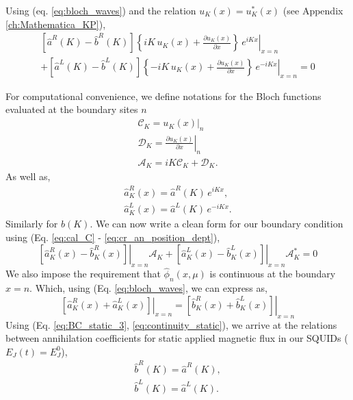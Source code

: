 %
Using (eq. \ref{eq:bloch_waves}) and the relation $u_K(x) = u^*_K(x)$ (see Appendix \ref{ch:Mathematica_KP}),
%
\begin{equation}\label{eq:BC_static_2}
\begin{split}
    \left[\hat{a}^R(K) - \hat{b}^R(K)\right]
    \left.
    \left\lbrace
    i K \, u_K(x) + \frac{\partial u_K(x)}{\partial x}
    \right\rbrace
    \,e^{i K x}
    \right|_{x=n}
    \\[2mm]
    +
    \left[\hat{a}^L(K) - \hat{b}^L(K)\right]
    \left.
    \left\lbrace
    -i K\, u_K(x) + \frac{\partial u_K(x)}{\partial x}
    \right\rbrace
    \,e^{-i K x} 
    \right|_{x=n}
    = 0 
\end{split}
\end{equation}
%




For computational convenience, we define notations for the Bloch functions evaluated at the boundary sites $n$
%
\begin{gather}
    \mathcal{C}_K = \left.u_K(x)\right|_{n}
    \label{eq:cal_C}\\
    \mathcal{D}_K = \left.\frac{\partial u_K(x)}{\partial x}\right|_{n}
    \label{eq:cal_D}\\
    \mathcal{A}_K = iK\mathcal{C}_K + \mathcal{D}_K.
    \label{eq:cal_A}
\end{gather}
%
As well as, 
\begin{subequations}\label{eq:cr_an_position_dept}
\begin{eqnarray}
    \hat{a}^R_K(x) = \hat{a}^R(K)\,e^{i K x},
    \\
    \hat{a}^L_K(x) = \hat{a}^L(K)\,e^{-i K x}. 
\end{eqnarray}
\end{subequations}
%
Similarly for $\hat{b}(K)$. We can now write a clean form for our boundary condition using (Eq. \ref{eq:cal_C} - \ref{eq:cr_an_position_dept}),
%
\begin{equation}\label{eq:BC_static_3}
    \left.\left[\hat{a}^R_K(x) - \hat{b}_K^R(x)\right]\right|_{x=n} \mathcal{A}_K
    +
    \left.\left[\hat{a}^L_K(x) - \hat{b}^L_K(x)\right]\right|_{x=n}\mathcal{A}^*_K = 0 
\end{equation}
%
We also impose the requirement that $\hat{\phi}_n(x,\mu)$ is continuous at the boundary $x=n$. Which, using (Eq. \ref{eq:bloch_waves}, we can express as,
%
\begin{equation}\label{eq:continuity_static}
    \left.\left[\hat{a}^R_K(x) + \hat{a}^L_K(x)\right]\right|_{x=n}
    =
    \left.\left[\hat{b}^R_K(x) + \hat{b}^L_K(x)\right]\right|_{x=n}
\end{equation}
%
Using (Eq. \ref{eq:BC_static_3}, \ref{eq:continuity_static}), we arrive at the relations between annihilation coefficients for static applied magnetic flux in our SQUIDs ($E_J(t)= E^0_J$),
%
\begin{subequations}\label{eq:static_solutions}
\begin{eqnarray}
    \hat{b}^R(K) = \hat{a}^R(K),
    \\
    \hat{b}^L(K) = \hat{a}^L(K).
\end{eqnarray}
\end{subequations}
%


